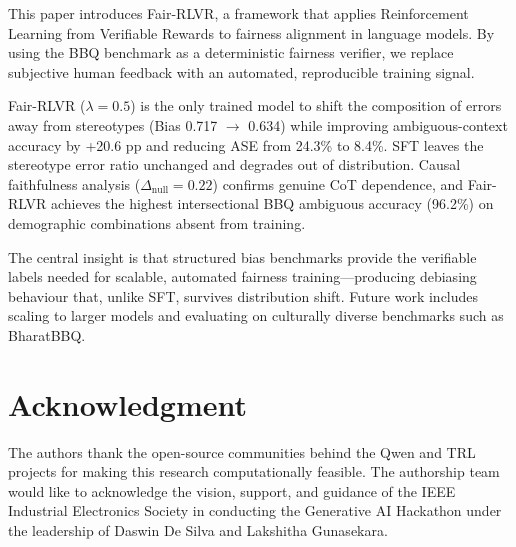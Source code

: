 \documentclass[conference]{IEEEtran}
\begin{document}
This paper introduces Fair-RLVR, a framework that applies Reinforcement Learning from Verifiable Rewards to fairness alignment in language models. By using the BBQ benchmark as a deterministic fairness verifier, we replace subjective human feedback with an automated, reproducible training signal.

Fair-RLVR ($\lambda=0.5$) is the only trained model to shift the composition of errors away from stereotypes (Bias 0.717 $\to$ 0.634) while improving ambiguous-context accuracy by +20.6 pp and reducing ASE from 24.3\% to 8.4\%. SFT leaves the stereotype error ratio unchanged and degrades out of distribution. Causal faithfulness analysis ($\Delta_{\text{null}} = 0.22$) confirms genuine CoT dependence, and Fair-RLVR achieves the highest intersectional BBQ ambiguous accuracy (96.2\%) on demographic combinations absent from training.

The central insight is that structured bias benchmarks provide the verifiable labels needed for scalable, automated fairness training---producing debiasing behaviour that, unlike SFT, survives distribution shift. Future work includes scaling to larger models and evaluating on culturally diverse benchmarks such as BharatBBQ.

\section*{Acknowledgment}

The authors thank the open-source communities behind the Qwen and TRL projects for making this research computationally feasible. The authorship team would like to acknowledge the vision, support, and guidance of the IEEE Industrial Electronics Society in conducting the Generative AI Hackathon under the leadership of Daswin De Silva and Lakshitha Gunasekara.



\end{document}
